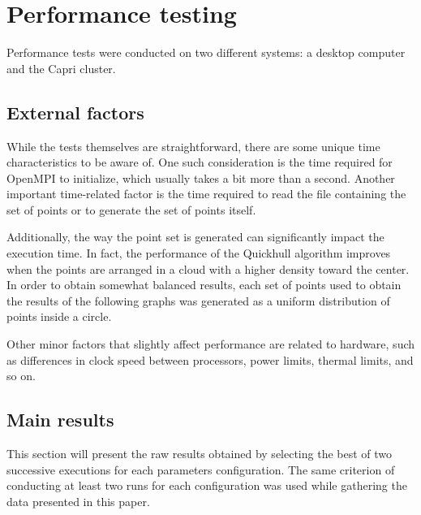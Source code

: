 \documentclass[a4paper]{article}
\begin{document}
\section{Performance testing}

Performance tests were conducted on two different systems: a desktop computer and the Capri cluster.

\subsection{External factors}

While the tests themselves are straightforward, there are some unique time characteristics to be aware of.
One such consideration is the time required for OpenMPI to initialize, which usually takes a bit more than a second.
Another important time-related factor is the time required to read the file containing the set of points or to generate the set of points itself.

Additionally, the way the point set is generated can significantly impact the execution time.
In fact, the performance of the Quickhull algorithm improves when the points are arranged in a cloud with a higher density toward the center.
In order to obtain somewhat balanced results, each set of points used to obtain the results of the following graphs was generated as a uniform distribution of points inside a circle.

Other minor factors that slightly affect performance are related to hardware, such as differences in clock speed between processors, power limits, thermal limits, and so on.

\subsection{Main results}

This section will present the raw results obtained by selecting the best of two successive executions for each parameters configuration.
The same criterion of conducting at least two runs for each configuration was used while gathering the data presented in this paper.
\end{document}

